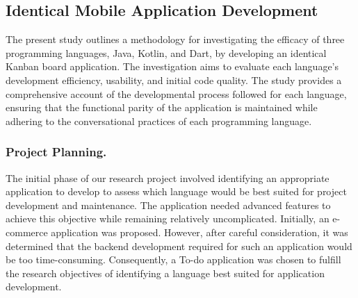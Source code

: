 \subsection{Identical Mobile Application Development}
The present study outlines a methodology for investigating the efficacy of three programming languages, Java, Kotlin, and Dart, by developing an identical Kanban board application. The investigation aims to evaluate each language's development efficiency, usability, and initial code quality. The study provides a comprehensive account of the developmental process followed for each language, ensuring that the functional parity of the application is maintained while adhering to the conversational practices of each programming language.
\subsubsection{Project Planning.}
The initial phase of our research project involved identifying an appropriate application to develop to assess which language would be best suited for project development and maintenance. The application needed advanced features to achieve this objective while remaining relatively uncomplicated. Initially, an e-commerce application was proposed. However, after careful consideration, it was determined that the backend development required for such an application would be too time-consuming. Consequently, a To-do application was chosen to fulfill the research objectives of identifying a language best suited for application development.
\par

